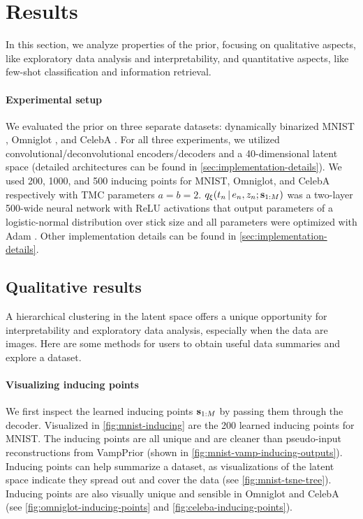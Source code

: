 \section{Results}
In this section, we 
analyze properties of the
\acronym\;prior,
focusing on
qualitative aspects, like exploratory data analysis and interpretability,
and quantitative aspects, like few-shot classification and information retrieval.
\paragraph{Experimental setup} We evaluated
the \acronym\;prior on three separate
datasets: dynamically binarized MNIST \citep{Lecun1998}, Omniglot \citep{Lake2015},
and CelebA \citep{Liu2015}. 
For all three experiments,
we utilized convolutional/deconvolutional encoders/decoders
and a 40-dimensional
latent space (detailed architectures can be found
in \autoref{sec:implementation-details}).
We used 200, 1000, and 500 inducing points for MNIST, Omniglot, and CelebA respectively 
with TMC parameters $a = b = 2$.
$q_{\xi}(t_n \,|\, e_n, z_n; \mathbf{s}_{1:M})$ was a
two-layer 500-wide neural network
with ReLU activations that output parameters of a
logistic-normal distribution over stick size
and all parameters were optimized with Adam \citep{Kingma2014}.
Other implementation details can be found in \autoref{sec:implementation-details}.

\subsection{Qualitative results}

A hierarchical clustering in the latent space
offers a unique opportunity for interpretability
and exploratory data analysis,
especially when the data are images.
Here are some methods for users to obtain
useful data summaries and explore a dataset.

\paragraph{Visualizing inducing points}
We first inspect the learned inducing points $\mathbf{s}_{1:M}$
by passing them through the decoder.
Visualized in \autoref{fig:mnist-inducing}
are the 200 learned inducing points for MNIST.
The inducing points are all unique
and are cleaner than pseudo-input reconstructions from VampPrior (shown in
\autoref{fig:mnist-vamp-inducing-outputs}).
Inducing points can help summarize a
dataset, as visualizations of the latent space
indicate they spread out and cover the data
(see \autoref{fig:mnist-tsne-tree}). Inducing points
are also visually unique and sensible
in Omniglot and CelebA (see
\autoref{fig:omniglot-inducing-points} and \ref{fig:celeba-inducing-points}).

